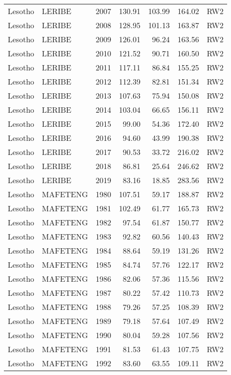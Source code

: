\begin{longtable}{lllrrrl}
  Lesotho & LERIBE & 2007 & 130.91 & 103.99 & 164.02 & RW2 \\ 
  Lesotho & LERIBE & 2008 & 128.95 & 101.13 & 163.87 & RW2 \\ 
  Lesotho & LERIBE & 2009 & 126.01 & 96.24 & 163.56 & RW2 \\ 
  Lesotho & LERIBE & 2010 & 121.52 & 90.71 & 160.50 & RW2 \\ 
  Lesotho & LERIBE & 2011 & 117.11 & 86.84 & 155.25 & RW2 \\ 
  Lesotho & LERIBE & 2012 & 112.39 & 82.81 & 151.34 & RW2 \\ 
  Lesotho & LERIBE & 2013 & 107.63 & 75.94 & 150.08 & RW2 \\ 
  Lesotho & LERIBE & 2014 & 103.04 & 66.65 & 156.11 & RW2 \\ 
  Lesotho & LERIBE & 2015 & 99.00 & 54.36 & 172.40 & RW2 \\ 
  Lesotho & LERIBE & 2016 & 94.60 & 43.99 & 190.38 & RW2 \\ 
  Lesotho & LERIBE & 2017 & 90.53 & 33.72 & 216.02 & RW2 \\ 
  Lesotho & LERIBE & 2018 & 86.81 & 25.64 & 246.62 & RW2 \\ 
  Lesotho & LERIBE & 2019 & 83.16 & 18.85 & 283.56 & RW2 \\ 
  Lesotho & MAFETENG & 1980 & 107.51 & 59.17 & 188.87 & RW2 \\ 
  Lesotho & MAFETENG & 1981 & 102.49 & 61.77 & 165.73 & RW2 \\ 
  Lesotho & MAFETENG & 1982 & 97.54 & 61.87 & 150.77 & RW2 \\ 
  Lesotho & MAFETENG & 1983 & 92.82 & 60.56 & 140.43 & RW2 \\ 
  Lesotho & MAFETENG & 1984 & 88.64 & 59.19 & 131.26 & RW2 \\ 
  Lesotho & MAFETENG & 1985 & 84.74 & 57.76 & 122.17 & RW2 \\ 
  Lesotho & MAFETENG & 1986 & 82.06 & 57.36 & 115.56 & RW2 \\ 
  Lesotho & MAFETENG & 1987 & 80.22 & 57.42 & 110.73 & RW2 \\ 
  Lesotho & MAFETENG & 1988 & 79.26 & 57.25 & 108.39 & RW2 \\ 
  Lesotho & MAFETENG & 1989 & 79.18 & 57.64 & 107.49 & RW2 \\ 
  Lesotho & MAFETENG & 1990 & 80.04 & 59.28 & 107.56 & RW2 \\ 
  Lesotho & MAFETENG & 1991 & 81.53 & 61.43 & 107.75 & RW2 \\ 
  Lesotho & MAFETENG & 1992 & 83.60 & 63.55 & 109.11 & RW2 \\ 

\end{longtable}
